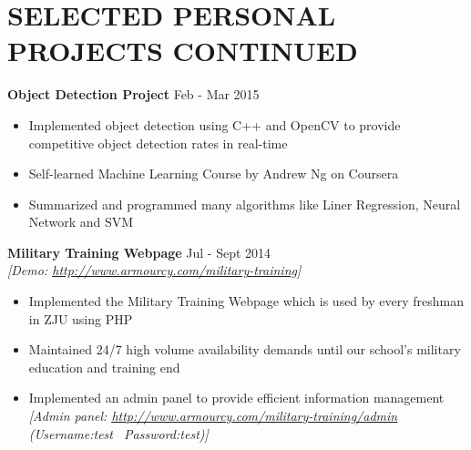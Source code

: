 \documentclass[11pt]{article} %
\begin{document}
\section{SELECTED PERSONAL PROJECTS CONTINUED}

\hspace{6mm}\textbf{Object Detection Project} \hfill Feb - Mar 2015
\begin{itemize}[leftmargin=16mm]
        \item Implemented object detection using C++ and OpenCV to provide competitive object detection rates in real-time
		\vspace{-2mm}
        \item Self-learned Machine Learning Course by Andrew Ng on Coursera
		\vspace{-2mm}
        \item Summarized and programmed many algorithms like Liner Regression, Neural Network and SVM
\end{itemize}
\vspace{1mm}

\hspace{6mm}\textbf{Military Training Webpage} \hfill Jul - Sept 2014\\
\vspace{1mm}
\hspace{6mm}\textit{[Demo: \underline{\href{http://www.armourcy.com/military-training}{http://www.armourcy.com/military-training}}]}
\begin{itemize}[leftmargin=16mm]
        \item Implemented the Military Training Webpage which is used by every freshman in ZJU using PHP
		\vspace{-2mm}
        \item Maintained 24/7 high volume availability demands until our school's military education and training end
		\vspace{-2mm}
        \item Implemented an admin panel to provide efficient information management\\
      	\textit{[Admin panel: \underline{\href{http://www.armourcy.com/military-training/admin}{http://www.armourcy.com/military-training/admin}} (Username:test \  Password:test)]}
\end{itemize}

\end{document}

